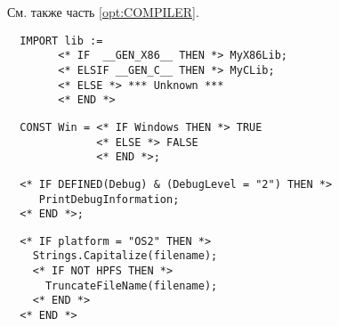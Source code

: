 См. также часть \ref{opt:COMPILER}.

\Examples
\begin{verbatim}
  IMPORT lib :=
        <* IF  __GEN_X86__ THEN *> MyX86Lib;
        <* ELSIF __GEN_C__ THEN *> MyCLib;
        <* ELSE *> *** Unknown ***
        <* END *>
\end{verbatim}

\begin{verbatim}
  CONST Win = <* IF Windows THEN *> TRUE
              <* ELSE *> FALSE
              <* END *>;
\end{verbatim}

\begin{verbatim}
  <* IF DEFINED(Debug) & (DebugLevel = "2") THEN *>
     PrintDebugInformation;
  <* END *>;
\end{verbatim}

\begin{verbatim}
  <* IF platform = "OS2" THEN *>
    Strings.Capitalize(filename);
    <* IF NOT HPFS THEN *>
      TruncateFileName(filename);
    <* END *>
  <* END *>
\end{verbatim}

